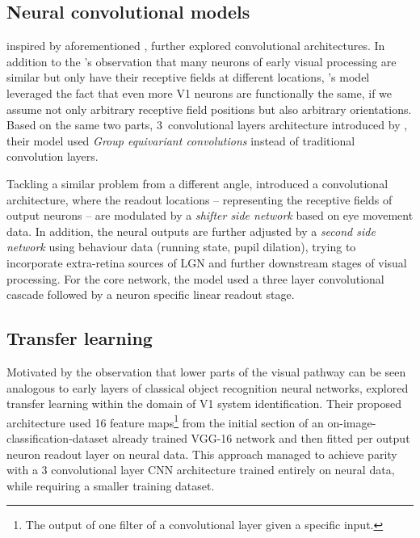 \subsection{Neural convolutional models}
\cite{ecker} inspired by aforementioned \cite{klindt}, further explored convolutional architectures. In addition to the \citeauthor{klindt}’s observation that many neurons of early visual processing are similar but only have their receptive fields at different locations, \citeauthor{ecker}’s model leveraged the fact that even more V1 neurons are functionally the same, if we assume not only arbitrary receptive field positions but also arbitrary orientations. Based on the same two parts, 3~convolutional layers architecture introduced by \citeauthor{klindt}, their model used \textit{Group equivariant convolutions} \citep{2016arXiv160207576C} instead of traditional convolution layers.

Tackling a similar problem from a different angle, \cite{Walke506956} introduced a convolutional architecture, where the readout locations -- representing the receptive fields of output neurons -- are modulated by a \textit{shifter side network} based on eye movement data. In addition, the neural outputs are further adjusted by a \textit{second side network} using behaviour data (running state, pupil dilation), trying to incorporate extra-retina sources of LGN and further downstream stages of visual processing. For the core network, the model used a three layer convolutional cascade followed by a neuron specific linear readout stage. 

\subsection{Transfer learning}

Motivated by the observation that lower parts of the visual pathway can be seen analogous to early layers of classical object recognition neural networks, \cite{10.1371/journal.pcbi.1006897} explored transfer learning within the domain of V1 system identification. Their proposed architecture used 16 feature maps\footnote{The output of one filter of a convolutional layer given a specific input.} from the initial section of an on-image-classification-dataset already trained VGG-16 network \citep{VGG16} and then fitted per output neuron readout layer on neural data. This approach managed to achieve parity with a 3 convolutional layer CNN architecture trained entirely on neural data, while requiring a smaller training dataset.
